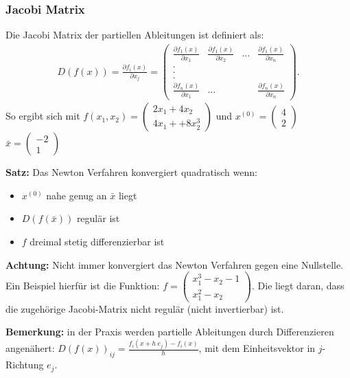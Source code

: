 \documentclass{scrartcl}
\begin{document}
\subsubsection*{Jacobi Matrix}
Die Jacobi Matrix der partiellen Ableitungen ist definiert als:
\begin{align*}
D(f(x))=\frac{\partial f_i(x)}{\partial x_j}=\begin{pmatrix}
\frac{\partial f_1(x)}{\partial x_1} & \frac{\partial f_1(x)}{\partial x_2} & ... & \frac{\partial f_1(x)}{\partial x_n} \\
.\\
.\\
.\\
\frac{\partial f_n(x)}{\partial x_1} & ... & & \frac{\partial f_n(x)}{\partial x_n} 
\end{pmatrix}.
\end{align*}
So ergibt sich mit $f(x_1,x_2)= \begin{pmatrix}
2 x_1 + 4 x_2 \\ 4 x_1++ 8x_2^3
\end{pmatrix}$ und $x^{(0)}= \begin{pmatrix}
4 \\ 2
\end{pmatrix}$ $\bar{x}= \begin{pmatrix}
-2 \\
1
\end{pmatrix}$

\textbf{Satz:} Das Newton Verfahren konvergiert quadratisch wenn:
\begin{itemize}
\item $x^{(0)}$ nahe genug an $\bar{x}$ liegt
\item $D(f(\bar{x}))$ regulär ist
\item $f$ dreimal stetig differenzierbar ist
\end{itemize}

\textbf{Achtung:} Nicht immer konvergiert das Newton Verfahren gegen eine Nullstelle. Ein Beispiel hierfür ist die Funktion: $f= \begin{pmatrix}
x_1^3 -x_2 -1 \\
x_1^2-x_2
\end{pmatrix}$.
Die liegt daran, dass die zugehörige Jacobi-Matrix nicht regulär (nicht invertierbar) ist.

\textbf{Bemerkung:} in der Praxis werden partielle Ableitungen durch Differenzieren angenähert: $D(f(x))_{i j}=\frac{f_i(x+h \ e_j)- f_i(x)}{h}$,
mit dem Einheitsvektor in $j$-Richtung $e_j$.
\end{document}
